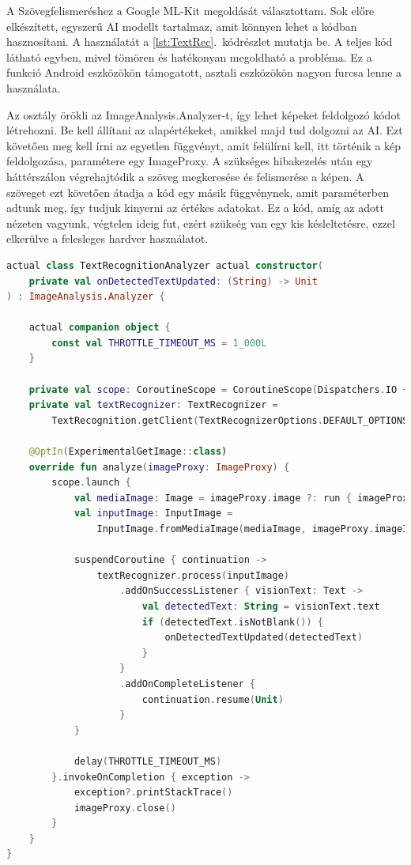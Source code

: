 A Szövegfelismeréshez a Google ML-Kit megoldását választottam.
Sok előre elkészített, egyszerű AI modellt tartalmaz, amit könnyen lehet a kódban hasznosítani.
A használatát a \ref{lst:TextRec}.~kódrészlet mutatja be. 
A teljes kód látható egyben, mivel tömören és hatékonyan megoldható a probléma.
Ez a funkció Android eszközökön támogatott, asztali eszközökön nagyon furcsa lenne a használata.

Az osztály örökli az ImageAnalysis.Analyzer-t, így lehet képeket feldolgozó kódot létrehozni.
Be kell állítani az alapértékeket, amikkel majd tud dolgozni az AI.
Ezt követően meg kell írni az egyetlen függvényt, amit felülírni kell, itt történik a kép feldolgozása, paramétere egy ImageProxy.
A szükséges hibakezelés után egy háttérszálon végrehajtódik a szöveg megkeresése és felismerése a képen.
A szöveget ezt követően átadja a kód egy másik függvénynek, amit paraméterben adtunk meg, így tudjuk kinyerni az értékes adatokat.
Ez a kód, amíg az adott nézeten vagyunk, végtelen ideig fut, ezért szükség van egy kis késleltetésre, ezzel elkerülve a felesleges hardver használatot.

\begin{lstlisting}[caption={Szövegfelismerés.}, label={lst:TextRec}, language=Kotlin]
actual class TextRecognitionAnalyzer actual constructor(
    private val onDetectedTextUpdated: (String) -> Unit
) : ImageAnalysis.Analyzer {

    actual companion object {
        const val THROTTLE_TIMEOUT_MS = 1_000L
    }

    private val scope: CoroutineScope = CoroutineScope(Dispatchers.IO + SupervisorJob())
    private val textRecognizer: TextRecognizer =
        TextRecognition.getClient(TextRecognizerOptions.DEFAULT_OPTIONS)

    @OptIn(ExperimentalGetImage::class)
    override fun analyze(imageProxy: ImageProxy) {
        scope.launch {
            val mediaImage: Image = imageProxy.image ?: run { imageProxy.close(); return@launch }
            val inputImage: InputImage =
                InputImage.fromMediaImage(mediaImage, imageProxy.imageInfo.rotationDegrees)

            suspendCoroutine { continuation ->
                textRecognizer.process(inputImage)
                    .addOnSuccessListener { visionText: Text ->
                        val detectedText: String = visionText.text
                        if (detectedText.isNotBlank()) {
                            onDetectedTextUpdated(detectedText)
                        }
                    }
                    .addOnCompleteListener {
                        continuation.resume(Unit)
                    }
            }

            delay(THROTTLE_TIMEOUT_MS)
        }.invokeOnCompletion { exception ->
            exception?.printStackTrace()
            imageProxy.close()
        }
    }
}
\end{lstlisting}